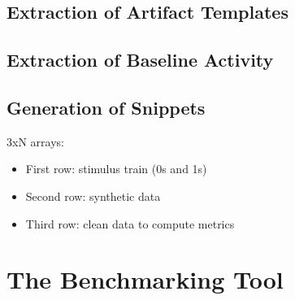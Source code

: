 \documentclass[12pt]{article}
\begin{document}
\subsection*{Extraction of Artifact Templates}

\subsection*{Extraction of Baseline Activity}

\subsection*{Generation of Snippets}
3xN arrays:
\begin{itemize}
      \item First row: stimulus train (0s and 1s)
      \item Second row: synthetic data
      \item Third row: clean data to compute metrics
\end{itemize}

\section*{The Benchmarking Tool}
\end{document}

